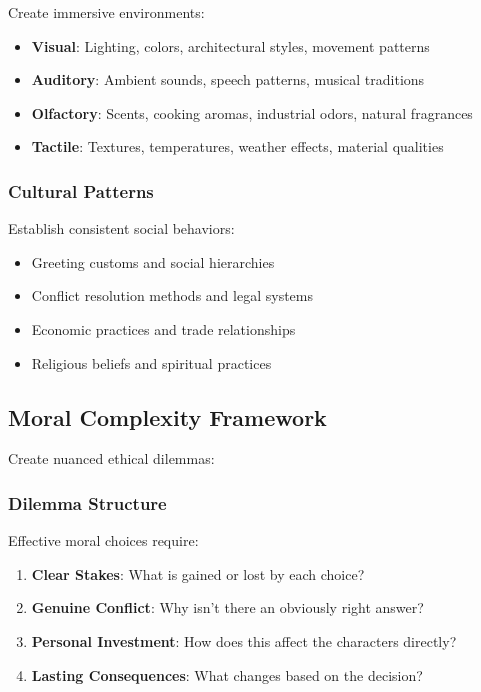 \documentclass[11pt]{article}
\begin{document}
Create immersive environments:

\begin{itemize}
  \item \textbf{Visual}: Lighting, colors, architectural styles, movement patterns
  \item \textbf{Auditory}: Ambient sounds, speech patterns, musical traditions
  \item \textbf{Olfactory}: Scents, cooking aromas, industrial odors, natural fragrances
  \item \textbf{Tactile}: Textures, temperatures, weather effects, material qualities
\end{itemize}

\subsubsection{Cultural Patterns}

Establish consistent social behaviors:

\begin{itemize}
  \item Greeting customs and social hierarchies
  \item Conflict resolution methods and legal systems
  \item Economic practices and trade relationships
  \item Religious beliefs and spiritual practices
\end{itemize}

\subsection{Moral Complexity Framework}

Create nuanced ethical dilemmas:

\subsubsection{Dilemma Structure}

Effective moral choices require:

\begin{enumerate}
  \item \textbf{Clear Stakes}: What is gained or lost by each choice?
  \item \textbf{Genuine Conflict}: Why isn't there an obviously right answer?
  \item \textbf{Personal Investment}: How does this affect the characters directly?
  \item \textbf{Lasting Consequences}: What changes based on the decision?
\end{enumerate}
\end{document}
